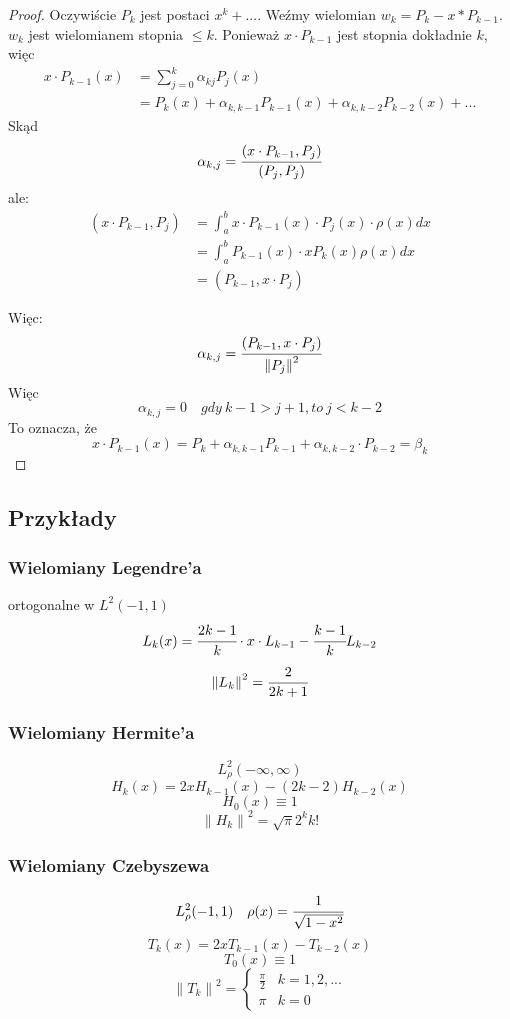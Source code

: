 \documentclass[hidelinks,a4paper,fleqn,oneside]{book}
\newcommand{\norm}[1]{\left\lVert#1\right\rVert}
\begin{document}
\begin{proof} Oczywiście $P_k$ jest postaci $x^k + ...$. Weźmy wielomian $w_k = P_k - x * P_{k-1}$. $w_k$ jest wielomianem stopnia $\leq k$. Ponieważ $x \cdot P_{k-1}$ jest stopnia dokładnie $k$, więc 
\[
	\begin{array}{cc}
	x \cdot P_{k-1}(x) & = \sum_{j=0}^k \alpha_{kj} P_j(x) \\
		& = P_k(x) + \alpha_{k, k-1} P_{k-1}(x) + \alpha_{k, k-2}P_{k-2}(x) + ...
	\end{array}
\]
Skąd
\[
	\alpha_{k, j} = \cfrac{(x \cdot P_{k-1}, P_j)}{(P_j, P_j)}
\]
ale:
\[
	\begin{array}{cc}
		(x \cdot P_{k-1}, P_j) & = \int_a^b x \cdot P_{k-1}(x) \cdot P_j(x) \cdot \rho(x) dx \\
		& = \int_a^b P_{k-1}(x) \cdot x P_k(x) \rho (x) dx  \\
		& = (P_{k-1}, x\cdot P_j)
	\end{array}
\]

Więc:
\[
	\alpha_{k, j} = \cfrac{(P_{k-1}, x \cdot P_j)}{\norm{P_j}^2}
\]
Więc
\[
	\alpha_{k, j} = 0 \quad gdy\ k-1 >j+1, to\ j < k-2
\]
To oznacza, że
\[
	x \cdot P_{k-1}(x) = P_k + \alpha_{k, k-1} P_{k-1} + \alpha_{k, k-2} \cdot P_{k-2} = \beta_k
\]

\end{proof}

\subsection{Przykłady}

\subsubsection{Wielomiany Legendre'a}

ortogonalne w $L^2(-1, 1)$
\[
	L_k(x) = \cfrac{2k-1}{k} \cdot x \cdot L_{k-1} - \cfrac{k-1}{k}L_{k-2}
\]
\[
	\norm{L_k}^2 = \cfrac{2}{2k+1}
\]

\subsubsection{Wielomiany Hermite'a}
\[
L_\rho^2(-\infty, \infty)
\]
\[
H_k(x) = 2xH_{k-1}(x) - (2k - 2)H_{k-2}(x)
\]
\[
	H_0(x) \equiv 1
\]
\[
	\norm{H_k}^2 = \sqrt{\pi} 2^k k!
\]
\subsubsection{Wielomiany Czebyszewa}
\[
	L_\rho^2(-1, 1) \quad \rho(x) = \cfrac{1}{\sqrt{1-x^2}}
\]
\[
	T_k(x) = 2xT_{k-1}(x) - T_{k-2}(x)
\]
\[
	T_0(x) \equiv 1
\]
\[
	\norm{T_k}^2 = \left\{ \begin{array}{rl} \frac{\pi}{2} & k = 1, 2, ... \\ \pi & k = 0\end{array}\right.
\]
\end{document}
